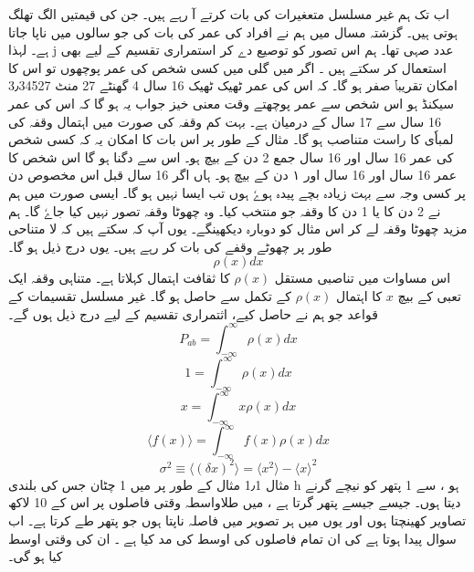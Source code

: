 \documentclass{book}
\begin{document}
اب تک ہم غیر مسلسل متعغیرات کی بات کرتے آ رہے ہیں۔  جن کی قیمتیں الگ تھلگ ہوتی ہیں۔  گزشتہ مسال میں ہم نے افراد کی عمر کی بات کی  جو سالوں میں ناپا جاتا ہے۔ لہذا j  عدد صہی تھا۔ ہم اس  تصور کو توصیع دے کر استمراری تقسیم کے لیے بھی استعمال کر سکتے ہیں ۔ اگر میں  گلی میں کسی شخص کی عمر پوچھوں  تو اس کا امکان  تقریباۡۡ صفر ہو گا۔ کہ اس کی  عمر ٹھیک ٹھیک 16 سال 4 گھنٹے 27 منٹ 3٫34527 سیکنڈ ہو   اس شخص سے عمر پوچھتے وقت معنی خیز جواب یہ ہو گا کہ اس کی عمر 16 سال سے 17 سال کے درمیان ہے۔ بہت کم وقفہ کی صورت میں اہتمال وقفہ کی لمباٗی کا راست متناصب ہو گا۔ مثال کے طور پر اس بات کا امکان یہ کہ کسی شخص کی عمر 16 سال اور 16 سال جمع 2 دن کے بیچ  ہو۔ اس سے دگنا ہو گا  اس شخص کا عمر  16 سال اور 16 سال اور ۱ دن کے بیچ ہو۔  ہاں اگر 16 سال قبل اس مخصوص دن پر کسی وجہ سے بہت زیادہ  بچے پیدہ ہوےٗ ہوں تب ایسا نہیں ہو گا۔ ایسی صورت میں ہم نے 2 دن کا یا 1 دن کا وقفہ جو منتخب کیا۔
 وہ چھوٹا وقفہ تصور نہیں کیا جاےٗ گا۔ ہم مزید چھوٹا وقفہ لے کر اس مثال کو دوبارہ دیکھینگے۔ یوں آپ کہ سکتے ہیں کہ لا متناحی طور پر چھوٹے وقفے کی بات کر رہے ہیں۔ یوں درج ذیل ہو گا۔ 
\begin{equation}
\rho (x) dx
\end{equation}
اس مساوات میں تناصبی مستقل 
$ \rho (x) $
کا ثقافت اہتمال کہلاتا ہے۔ متناہی وقفہ ایک تعبی کے بیچ 
$ x $
کا اہتمال 
$ \rho (x) $
  کے تکمل سے حاصل ہو گا۔ غیر مسلسل تقسیمات  کے قواعد جو ہم نے حاصل کیے،  اثتمراری تقسیم کے لیے درج ذیل ہوں گے۔ 
\begin{equation}
P_{ab} = \int_{-\infty}^{\infty} \rho (x) dx
\end{equation}
\begin{equation}
 1 = \int_{- \infty}^{\infty} \rho (x) dx
\end{equation}
\begin{equation}
x = \int_{ - \infty }^{ \infty} x \rho (x) dx
\end{equation}
\begin{equation}
\langle f(x) \rangle = \int_{ - \infty }^{\infty } f(x) \rho (x) dx 
\end{equation}
\begin{equation}
\sigma^2 \equiv \langle ( \delta x)^2 \rangle=\langle x^2\rangle -  \langle  x  \rangle ^2
\end{equation}
مثال 1٫1  مثال کے طور پر میں 1 چٹان جس کی بلندی h ہو ، سے 1 پتھر کو نیچے گرنے دیتا ہوں۔ جیسے جیسے پتھر گرتا ہے ، میں طلاواسطہ وقتی فاصلوں پر اس کے 10 لاکھ تصاویر کھینچتا ہوں اور یوں میں ہر تصویر میں فاصلہ ناپتا ہوں جو پتھر طے کرتا ہے۔ اب سوال پیدا ہوتا ہے کی ان تمام فاصلوں کی اوسط  کی مد کیا ہے ۔ ان کی وقتی اوسط کیا ہو گی۔ 
\end{document}
